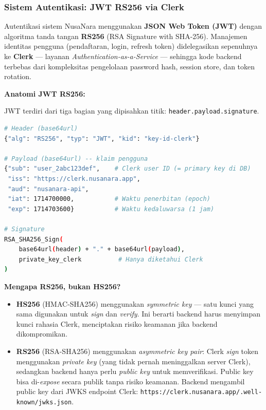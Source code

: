 \subsubsection{Sistem Autentikasi: JWT RS256 via Clerk}
\label{subsec:auth_jwt}

Autentikasi sistem NusaNara menggunakan \textbf{JSON Web Token (JWT)} dengan
algoritma tanda tangan \textbf{RS256} (RSA Signature with SHA-256).
Manajemen identitas pengguna (pendaftaran, login, refresh token) didelegasikan
sepenuhnya ke \textbf{Clerk} --- layanan \textit{Authentication-as-a-Service} ---
sehingga kode backend terbebas dari kompleksitas pengelolaan password hash,
session store, dan token rotation.

\textbf{Anatomi JWT RS256:}

JWT terdiri dari tiga bagian yang dipisahkan titik: \texttt{header.payload.signature}.

\begin{lstlisting}[language=bash, caption={Contoh Struktur JWT (Header, Payload, Signature)}]
# Header (base64url)
{"alg": "RS256", "typ": "JWT", "kid": "key-id-clerk"}

# Payload (base64url) -- klaim pengguna
{"sub": "user_2abc123def",    # Clerk user ID (= primary key di DB)
 "iss": "https://clerk.nusanara.app",
 "aud": "nusanara-api",
 "iat": 1714700000,           # Waktu penerbitan (epoch)
 "exp": 1714703600}           # Waktu kedaluwarsa (1 jam)

# Signature
RSA_SHA256_Sign(
    base64url(header) + "." + base64url(payload),
    private_key_clerk          # Hanya diketahui Clerk
)
\end{lstlisting}

\noindent \textbf{Mengapa RS256, bukan HS256?}
\begin{itemize}
  \item \textbf{HS256} (HMAC-SHA256) menggunakan \textit{symmetric key} ---
    satu kunci yang sama digunakan untuk \textit{sign} dan \textit{verify}.
    Ini berarti backend harus menyimpan kunci rahasia Clerk, menciptakan risiko
    keamanan jika backend dikompromikan.
  \item \textbf{RS256} (RSA-SHA256) menggunakan \textit{asymmetric key pair}:
    Clerk \textit{sign} token menggunakan \textit{private key} (yang tidak pernah
    meninggalkan server Clerk), sedangkan backend hanya perlu \textit{public key}
    untuk memverifikasi. Public key bisa di-\textit{expose} secara publik tanpa
    risiko keamanan. Backend mengambil public key dari JWKS endpoint Clerk:
    \texttt{https://clerk.nusanara.app/.well-known/jwks.json}.
\end{itemize}

